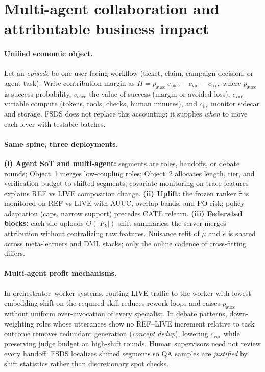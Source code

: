 
\section{Multi-agent collaboration and attributable business impact}

\paragraph{Unified economic object.}
Let an \emph{episode} be one user-facing workflow (ticket, claim, campaign decision, or agent task).
Write contribution margin as
\(
\Pi = p_{\mathrm{succ}}\, v_{\mathrm{succ}} - c_{\mathrm{var}} - c_{\mathrm{fix}},
\)
where $p_{\mathrm{succ}}$ is success probability, $v_{\mathrm{succ}}$ the value of success (margin or avoided loss),
$c_{\mathrm{var}}$ variable compute (tokens, tools, checks, human minutes), and $c_{\mathrm{fix}}$ monitor sidecar and storage.
FSDS does not replace this accounting; it supplies \emph{when} to move each lever with testable batches.

\paragraph{Same spine, three deployments.}
\textbf{(i) Agent SoT and multi-agent:} segments are roles, handoffs, or debate rounds;
Object~1 merges low-coupling roles; Object~2 allocates length, tier, and verification budget to shifted segments;
covariate monitoring on trace features explains REF vs LIVE composition change.
\textbf{(ii) Uplift:} the frozen ranker $\hat\tau$ is monitored on REF vs LIVE with AUUC, overlap bands, and PO-risk;
policy adaptation (caps, narrow support) precedes CATE relearn.
\textbf{(iii) Federated blocks:} each silo uploads $O(|F_k|)$ shift summaries; the server merges attribution without centralizing raw features.
Nuisance refit of $\hat\mu$ and $\hat e$ is shared across meta-learners and DML stacks; only the online cadence of cross-fitting differs.

\paragraph{Multi-agent profit mechanisms.}
In orchestrator--worker systems, routing LIVE traffic to the worker with lowest embedding shift on the required skill reduces rework loops and raises $p_{\mathrm{succ}}$ without uniform over-invocation of every specialist.
In debate patterns, down-weighting roles whose utterances show no REF--LIVE increment relative to task outcome removes redundant generation (\emph{concept dedup}), lowering $c_{\mathrm{var}}$ while preserving judge budget on high-shift rounds.
Human supervisors need not review every handoff: FSDS localizes shifted segments so QA samples are \emph{justified} by shift statistics rather than discretionary spot checks.

